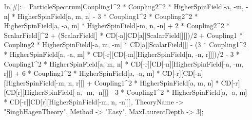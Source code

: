In[#]:= ParticleSpectrum[Coupling1^2 * Coupling2^2 * HigherSpinField[-a, -m, -n] * HigherSpinField[a, m, n] - 3 * Coupling1^2 * Coupling2^2 * HigherSpinField[a, -a, m] * HigherSpinField[-m, n, -n] + 2 * Coupling2^2 * ScalarField[]^2 + (ScalarField[] * CD[-a][CD[a][ScalarField[]]])/2 + Coupling1 * Coupling2 * HigherSpinField[-a, m, -m] * CD[a][ScalarField[]] - (3 * Coupling1^2 * HigherSpinField[a, -a, m] * CD[-r][CD[-m][HigherSpinField[n, -n, r]]])/2 - 3 * Coupling1^2 * HigherSpinField[a, m, n] * CD[-r][CD[-n][HigherSpinField[-a, -m, r]]] + 6 * Coupling1^2 * HigherSpinField[a, -a, m] * CD[-r][CD[-n][HigherSpinField[-m, n, r]]] + Coupling1^2 * HigherSpinField[a, m, n] * CD[-r][CD[r][HigherSpinField[-a, -m, -n]]] - 3 * Coupling1^2 * HigherSpinField[a, -a, m] * CD[-r][CD[r][HigherSpinField[-m, n, -n]]], TheoryName -> "SinghHagenTheory", Method -> "Easy", MaxLaurentDepth -> 3]; 